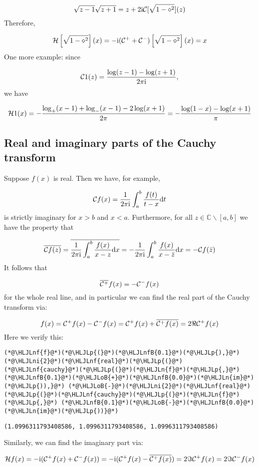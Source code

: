 \documentclass[12pt,a4paper]{article}
\newcommand{\HLJLn}[1]{#1}
\newcommand{\HLJLnf}[1]{\textcolor[RGB]{66,102,213}{#1}}
\newcommand{\HLJLnfB}[1]{\textcolor[RGB]{59,151,46}{#1}}
\newcommand{\HLJLni}[1]{\textcolor[RGB]{59,151,46}{#1}}
\newcommand{\HLJLoB}[1]{\textcolor[RGB]{102,102,102}{\textbf{#1}}}
\newcommand{\HLJLp}[1]{#1}
\def\D{ {\rm d} }
\def\I{ {\rm i} }
\def\C{ {\mathbb C} }
\def\CC{ {\cal C} }
\def\HH{ {\cal H} }
\def\dx{\D x}
\def\dt{\D t}
\begin{document}
\[
\sqrt{z-1}\sqrt{z+1} = z  + 2 \I {\cal C}[\sqrt{1-\diamond^2}](z)
\]
Therefore,

\[
{\cal H}\left[{\sqrt{1-\diamond^2}}\right](x) = -\I (\CC^+  + \CC^-) \left[{\sqrt{1-\diamond^2}}\right](x) = x
\]
One more example: since

\[
\CC 1(z) = {\log(z-1) - \log(z+1) \over 2 \pi \I},
\]
we have

\[
\HH 1(x) = -{\log_+(x-1) + \log_-(x-1) - 2\log(x+1) \over 2\pi} = -{\log(1-x) - \log(x+1) \over \pi}
\]
\subsection{Real and imaginary parts of the Cauchy transform}
Suppose $f(x)$ is real. Then we have, for example,

\[
\CC f(x) = {1 \over 2 \pi \I} \int_a^b {f(t) \over t- x} \dt
\]
is strictly imaginary for $x > b$ and $x < a$.  Furthermore, for all $z \in \C \backslash [a,b]$ we have the property that

\[
\overline{\CC f( z)} = \overline{{1 \over 2 \pi \I} \int_a^b {f(x) \over x - z} \dx} =
-{1 \over 2 \pi \I} \int_a^b {f(x) \over x - \bar z} \dx = - \CC f(\bar z)
\]
It follows that

\[
\overline{\CC^+} f(x) = - \CC^- f(x)
\]
for the whole real line, and in particular we can find the real part of the Cauchy transform via:

\[
f(x) = \CC^+ f(x) - \CC^- f(x) = \CC^+ f(x) + \overline{\CC^+ f(x)} = 2 \Re \CC^+ f(x)
\]
Here we verify this:


\begin{lstlisting}
(*@\HLJLnf{f}@*)(*@\HLJLp{(}@*)(*@\HLJLnfB{0.1}@*)(*@\HLJLp{),}@*) (*@\HLJLni{2}@*)(*@\HLJLnf{real}@*)(*@\HLJLp{(}@*)(*@\HLJLnf{cauchy}@*)(*@\HLJLp{(}@*)(*@\HLJLn{f}@*)(*@\HLJLp{,}@*) (*@\HLJLnfB{0.1}@*)(*@\HLJLoB{+}@*)(*@\HLJLnfB{0.0}@*)(*@\HLJLn{im}@*)(*@\HLJLp{)),}@*) (*@\HLJLoB{-}@*)(*@\HLJLni{2}@*)(*@\HLJLnf{real}@*)(*@\HLJLp{(}@*)(*@\HLJLnf{cauchy}@*)(*@\HLJLp{(}@*)(*@\HLJLn{f}@*)(*@\HLJLp{,}@*) (*@\HLJLnfB{0.1}@*)(*@\HLJLoB{-}@*)(*@\HLJLnfB{0.0}@*)(*@\HLJLn{im}@*)(*@\HLJLp{))}@*)
\end{lstlisting}

\begin{lstlisting}
(1.0996311793408586, 1.0996311793408586, 1.0996311793408586)
\end{lstlisting}


Similarly, we can find the imaginary part via:

\[
{\cal H} f(x) = -\I(\CC^+ f(x) + \CC^- f(x)) = -\I(\CC^+ f(x) - \overline{\CC^+ f(x)}) =
2 \Im \CC^+ f(x) = 2 \Im \CC^- f(x)
\]
\end{document}
